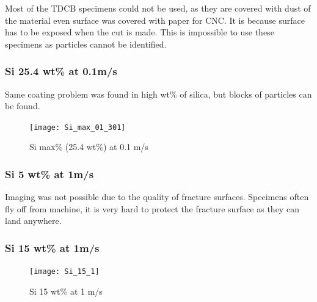 \documentclass[numbers=noendperiod,chapterprefix=on]{icldt} %
\begin{document}
{%






Most of the TDCB specimens could not be used, as they are covered with dust of the material even surface was covered with paper for CNC. It is because surface has to be exposed when the cut is made. This is impossible to use these specimens as particles cannot be identified. 

\subsubsection{Si 25.4 wt\% at 0.1m/s}

Same coating problem was found in high wt\% of silica, but blocks of particles can be found.

\begin{figure}[!hp]
\centering
\texttt{[image: Si\_max\_01\_301]}
\caption{Si max\% (25.4 wt\%) at 0.1 m/s} \label{Si_max_0.1_301}
\end{figure}
\FloatBarrier


\subsubsection{Si 5 wt\% at 1m/s}
Imaging was not possible due to the quality of fracture surfaces. Specimens often fly off from machine, it is very hard to protect the fracture surface as they can land anywhere. 

\subsubsection{Si 15 wt\% at 1m/s}

\begin{figure}[!hp]
\centering
\texttt{[image: Si\_15\_1]}
\caption{Si 15 wt\% at 1 m/s} \label{Si_15_1}
\end{figure}
\FloatBarrier

}
\end{document}
